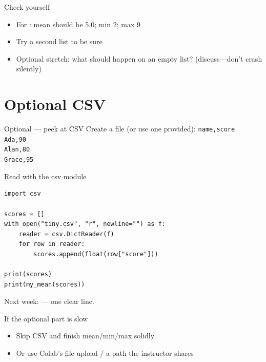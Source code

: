 \documentclass[aspectratio=169,11pt]{beamer}
\begin{document}
    \begin{frame}{Check yourself}
        \begin{itemize}
            \item For \pycode{[5, 2, 9, 2, 7]}: mean should be 5.0; min 2; max 9
            \item Try a second list to be sure
            \item Optional stretch: what should happen on an empty list? (discuss---don't crash silently)
        \end{itemize}
        \vspace{0.4em}
    \end{frame}

    \section{Optional CSV}

    \begin{frame}{Optional --- peek at CSV}
        Create a file  (or use one provided):
        \vspace{0.3em}
        {\small
        \texttt{name,score}\\
        \texttt{Ada,90}\\
        \texttt{Alan,80}\\
        \texttt{Grace,95}
        }
    \end{frame}

    \begin{frame}[fragile]{Read with the csv module}
        \begin{lstlisting}
import csv

scores = []
with open("tiny.csv", "r", newline="") as f:
    reader = csv.DictReader(f)
    for row in reader:
        scores.append(float(row["score"]))

print(scores)
print(my_mean(scores))
        \end{lstlisting}
        \vspace{0.3em}
        Next week:  --- one clear line.
    \end{frame}

    \begin{frame}{If the optional part is slow}
        \begin{itemize}
            \item Skip CSV and finish mean/min/max solidly
            \item Or use Colab's file upload / a path the instructor shares
        \end{itemize}
        \vspace{0.4em}
    \end{frame}
\end{document}
